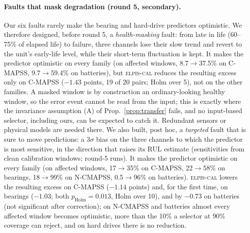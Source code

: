 \documentclass{esannV2}
\newcommand{\AUTO}{\textsc{elpis-cal}}
\begin{document}
\paragraph{Faults that mask degradation (round 5, secondary).} Our six faults rarely make the bearing and hard-drive predictors optimistic. We therefore designed, before round 5, a \emph{health-masking} fault: from late in life (60--75\% of elapsed life) to failure, three channels lose their slow trend and revert to the unit's early-life level, while their short-term fluctuation is kept. It makes the predictor optimistic on every family (on affected windows, 8.7$\to$37.5\% on C-MAPSS, 9.7$\to$59.4\% on batteries), but \AUTO{} reduces the resulting excess only on C-MAPSS ($-1.43$ points, 19 of 20 pairs; Holm over 5), not on the other families. A masked window is by construction an ordinary-looking healthy window, so the error event cannot be read from the input; this is exactly where the invariance assumption (A) of Prop.~\ref{prop:transfer} fails, and no input-based selector, including ours, can be expected to catch it. Redundant sensors or physical models are needed there. We also built, post hoc, a \emph{targeted} fault that is sure to move predictions: a $3\sigma$ bias on the three channels to which the predictor is most sensitive, in the direction that raises its RUL estimate (sensitivities from clean calibration windows; round-5 runs). It makes the predictor optimistic on every family (on affected windows, 17$\to$35\% on C-MAPSS, 22$\to$58\% on bearings, 18$\to$99\% on N-CMAPSS, 0.5$\to$96\% on batteries). \AUTO{} lowers the resulting excess on C-MAPSS ($-1.14$ points) and, for the first time, on bearings ($-1.03$; both $p_{\text{Holm}}=0.013$, Holm over 10), and by $-0.73$ on batteries (not significant after correction); on N-CMAPSS and batteries almost every affected window becomes optimistic, more than the 10\% a selector at 90\% coverage can reject, and on hard drives there is no reduction.




\FloatBarrier
\end{document}
